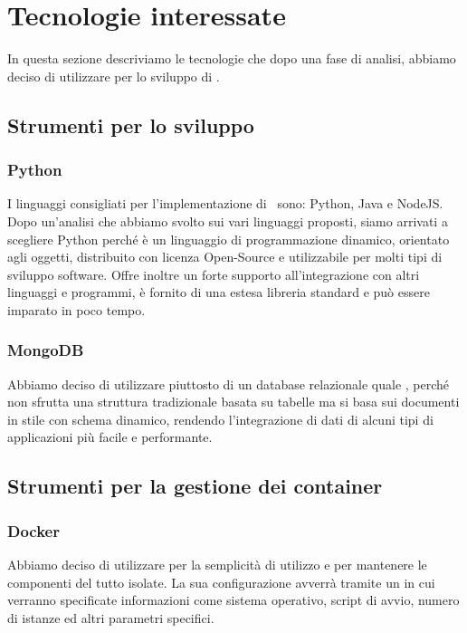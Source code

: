 \section{Tecnologie interessate}\label{Tecnologie}
In questa sezione descriviamo le tecnologie che dopo una fase di analisi, abbiamo deciso di utilizzare per lo sviluppo di \progetto.

\subsection{Strumenti per lo sviluppo}

\subsubsection{Python}
I linguaggi consigliati per l'implementazione di \progetto\ sono: Python, Java e NodeJS. Dopo un'analisi che abbiamo svolto sui vari linguaggi proposti, siamo
arrivati a scegliere Python perché è un linguaggio di programmazione dinamico, orientato agli oggetti, distribuito con licenza Open-Source e utilizzabile
per molti tipi di sviluppo software. Offre inoltre un forte supporto all'integrazione con altri linguaggi e programmi, è fornito di una estesa libreria standard e
può essere imparato in poco tempo.


\subsubsection{MongoDB}
Abbiamo deciso di utilizzare  piuttosto di un database relazionale quale , perché non sfrutta una struttura tradizionale basata su
tabelle ma si basa sui documenti in stile  con schema dinamico, rendendo l’integrazione di dati di alcuni tipi di applicazioni più facile e performante.

\subsection{Strumenti per la gestione dei container}

\subsubsection{Docker}
Abbiamo deciso di utilizzare  per la semplicità di utilizzo e per mantenere le componenti del tutto isolate.
La sua configurazione avverrà tramite un  in cui verranno specificate informazioni come sistema operativo, script di avvio,
numero di istanze ed altri parametri specifici.

